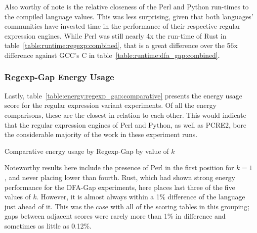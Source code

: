 Also worthy of note is the relative closeness of the Perl and Python run-times to the compiled language values. This was less surprising, given that both languages' communities have invested time in the performance of their respective regular expression engines. While Perl was still nearly 4x the run-time of Rust in table~\ref{table:runtime:regexp:combined}, that is a great difference over the 56x difference against GCC's C in table~\ref{table:runtime:dfa_gap:combined}.

\subsubsection{Regexp-Gap Energy Usage}

Lastly, table~\ref{table:energy:regexp_gap:comparative} presents the energy usage score for the regular expression variant experiments. Of all the energy comparisons, these are the closest in relation to each other. This would indicate that the regular expression engines of Perl and Python, as well as PCRE2, bore the considerable majority of the work in these experiment runs.

\begin{table}[!htb]

\caption{Comparative energy usage by Regexp-Gap by value of $k$}
\label{table:energy:regexp_gap:comparative}
\end{table}

Noteworthy results here include the presence of Perl in the first position for $k=1$, and never placing lower than fourth. Rust, which had shown strong energy performance for the DFA-Gap experiments, here places last three of the five values of $k$. However, it is almost always within a 1\% difference of the language just ahead of it. This was the case with all of the scoring tables in this grouping; gaps between adjacent scores were rarely more than 1\% in difference and sometimes as little as 0.12\%.
